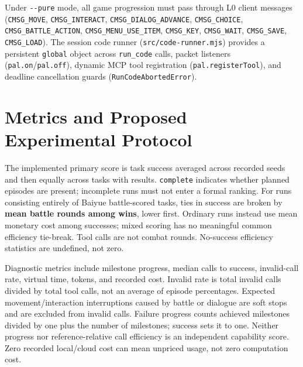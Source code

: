 \documentclass[11pt,a4paper]{article}
\begin{document}
Under \texttt{-\allowbreak{}-\allowbreak{}pure} mode, all game progression must pass through L0 client messages (\texttt{CMSG\allowbreak{}\_\allowbreak{}MOVE}, \texttt{CMSG\allowbreak{}\_\allowbreak{}INTERACT}, \texttt{CMSG\allowbreak{}\_\allowbreak{}DIALOG\allowbreak{}\_\allowbreak{}ADVANCE}, \texttt{CMSG\allowbreak{}\_\allowbreak{}CHOICE}, \texttt{CMSG\allowbreak{}\_\allowbreak{}BATTLE\allowbreak{}\_\allowbreak{}ACTION}, \texttt{CMSG\allowbreak{}\_\allowbreak{}MENU\allowbreak{}\_\allowbreak{}USE\allowbreak{}\_\allowbreak{}ITEM}, \texttt{CMSG\allowbreak{}\_\allowbreak{}KEY}, \texttt{CMSG\allowbreak{}\_\allowbreak{}WAIT}, \texttt{CMSG\allowbreak{}\_\allowbreak{}SAVE}, \texttt{CMSG\allowbreak{}\_\allowbreak{}LOAD}). The session code runner (\texttt{src\allowbreak{}/\allowbreak{}code\allowbreak{}-\allowbreak{}runner\allowbreak{}.\allowbreak{}mjs}) provides a persistent \texttt{global} object across \texttt{run\allowbreak{}\_\allowbreak{}code} calls, packet listeners (\texttt{pal\allowbreak{}.\allowbreak{}on}/\texttt{pal\allowbreak{}.\allowbreak{}off}), dynamic MCP tool registration (\texttt{pal\allowbreak{}.\allowbreak{}register\allowbreak{}Tool}), and deadline cancellation guards (\texttt{RunCodeA\allowbreak{}bortedEr\allowbreak{}ror}).

\section{\texorpdfstring{Metrics and Proposed Experimental Protocol}{Metrics and Proposed Experimental Protocol}}

The implemented primary score is task success averaged across recorded seeds and then equally across tasks with results. \texttt{complete} indicates whether planned episodes are present; incomplete runs must not enter a formal ranking. For runs consisting entirely of Baiyue battle-scored tasks, ties in success are broken by \textbf{mean battle rounds among wins}, lower first. Ordinary runs instead use mean monetary cost among successes; mixed scoring has no meaningful common efficiency tie-break. Tool calls are not combat rounds. No-success efficiency statistics are undefined, not zero.

Diagnostic metrics include milestone progress, median calls to success, invalid-call rate, virtual time, tokens, and recorded cost. Invalid rate is total invalid calls divided by total tool calls, not an average of episode percentages. Expected movement/interaction interruptions caused by battle or dialogue are soft stops and are excluded from invalid calls. Failure progress counts achieved milestones divided by one plus the number of milestones; success sets it to one. Neither progress nor reference-relative call efficiency is an independent capability score. Zero recorded local/cloud cost can mean unpriced usage, not zero computation cost.
\end{document}
